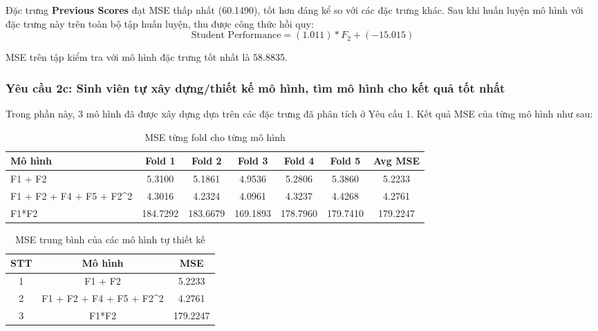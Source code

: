 Đặc trưng \textbf{Previous Scores} đạt MSE thấp nhất (60.1490), tốt hơn đáng kể so với các đặc trưng khác. Sau khi huấn luyện mô hình với đặc trưng này trên toàn bộ tập huấn luyện, thu được công thức hồi quy:
$$\text{Student Performance} = (1.011)*F_2 + (-15.015)$$

MSE trên tập kiểm tra với mô hình đặc trưng tốt nhất là 58.8835.

\subsubsection{Yêu cầu 2c:  Sinh viên tự xây dựng/thiết kế mô hình, tìm mô hình cho kết quả tốt nhất}
Trong phần này, 3 mô hình đã được xây dựng dựa trên các đặc trưng đã phân tích ở Yêu cầu 1. Kết quả MSE của từng mô hình như sau:

\begin{table}[htbp]
	\centering
	\caption{MSE từng fold cho từng mô hình}
	\begin{tabular}{|l|c|c|c|c|c|c|}
		\hline
		\textbf{Mô hình}            & \textbf{Fold 1} & \textbf{Fold 2} & \textbf{Fold 3} & \textbf{Fold 4} & \textbf{Fold 5} & \textbf{Avg MSE} \\
		\hline
		F1 + F2                     & 5.3100          & 5.1861          & 4.9536          & 5.2806          & 5.3860          & 5.2233           \\
		\hline
		F1 + F2 + F4 + F5 + F2\^{}2 & 4.3016          & 4.2324          & 4.0961          & 4.3237          & 4.4268          & 4.2761           \\
		\hline
		F1*F2                       & 184.7292        & 183.6679        & 169.1893        & 178.7960        & 179.7410        & 179.2247         \\
		\hline
	\end{tabular}
\end{table}

\begin{table}[htbp]
	\centering
	\caption{MSE trung bình của các mô hình tự thiết kế}
	\begin{tabular}{|c|c|c|}
		\hline
		\textbf{STT} & \textbf{Mô hình}            & \textbf{MSE} \\
		\hline
		1            & F1 + F2                     & 5.2233       \\
		\hline
		2            & F1 + F2 + F4 + F5 + F2\^{}2 & 4.2761       \\
		\hline
		3            & F1*F2                       & 179.2247     \\
		\hline
	\end{tabular}
\end{table}

